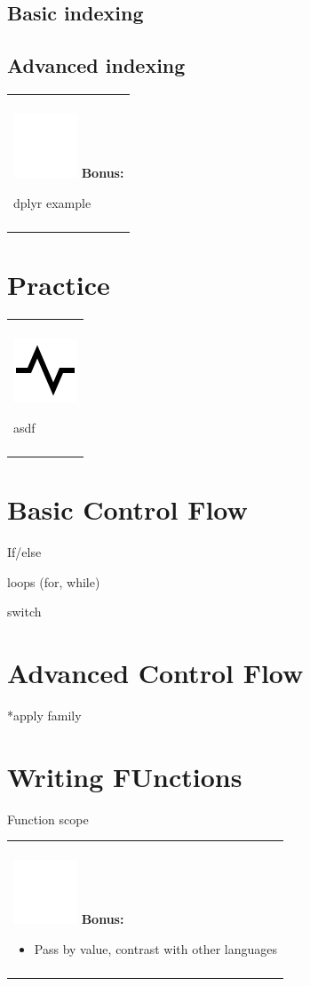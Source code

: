 \documentclass[
]{book}
\providecommand{\tightlist}{%
  \setlength{\itemsep}{0pt}\setlength{\parskip}{0pt}}
\newenvironment{bonus}
{
  \begin{center}
  \begin{tabular}{|>{\columncolor{bonus}\color{white}}p{0.9\textwidth}|}\hline\\
  \includegraphics[scale=0.1]{src/images/sun-fill-invert.png}
  \textbf{Bonus:}
}
{\\\\\hline
  \end{tabular}
  \end{center}
}
\newenvironment{progress}
{
  \begin{center}
  \begin{tabular}{|>{\columncolor{progress}}p{0.9\textwidth}|}
  \hline\\
  \includegraphics[scale=0.1]{src/images/pulse-line.png}
}
{\\\\\hline
  \end{tabular}
  \end{center}
}
\begin{document}
\hypertarget{basic-indexing}{%
\subsection{Basic indexing}\label{basic-indexing}}

\hypertarget{advanced-indexing}{%
\subsection{Advanced indexing}\label{advanced-indexing}}

\begin{bonus}
dplyr example
\end{bonus}

\hypertarget{practice-1}{%
\section{Practice}\label{practice-1}}

\begin{progress}
asdf
\end{progress}

\hypertarget{basic-control-flow}{%
\section{Basic Control Flow}\label{basic-control-flow}}

If/else

loops (for, while)

switch

\hypertarget{advanced-control-flow}{%
\section{Advanced Control Flow}\label{advanced-control-flow}}

*apply family

\hypertarget{writing-functions}{%
\section{Writing FUnctions}\label{writing-functions}}

Function scope

\begin{bonus}
\begin{itemize}
\tightlist
\item
  Pass by value, contrast with other languages
\end{itemize}
\end{bonus}
\end{document}
